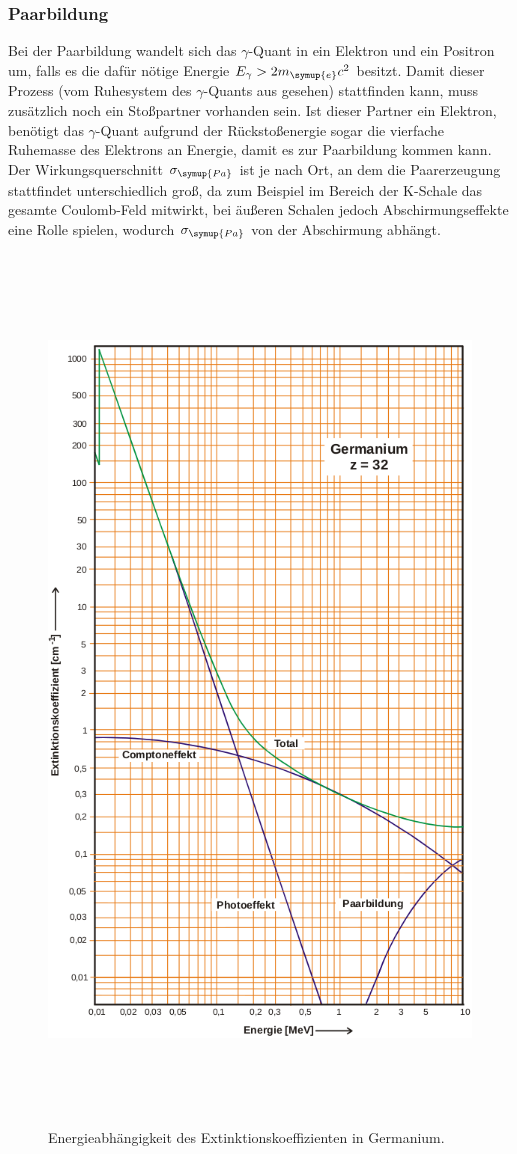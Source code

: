 \subsubsection{Paarbildung}
Bei der Paarbildung wandelt sich das $\gamma$-Quant in ein Elektron und ein Positron um, falls es die dafür nötige Energie $E_{\gamma}>2m_{\symup{e}}c^2$ besitzt.
Damit dieser Prozess (vom Ruhesystem des $\gamma$-Quants aus gesehen) stattfinden kann, muss zusätzlich noch ein Stoßpartner vorhanden sein.
Ist dieser Partner ein Elektron, benötigt das $\gamma$-Quant aufgrund der Rückstoßenergie sogar die vierfache Ruhemasse des Elektrons an Energie, damit es zur Paarbildung kommen kann.
Der Wirkungsquerschnitt $\sigma_{\symup{Pa}}$ ist je nach Ort, an dem die Paarerzeugung stattfindet unterschiedlich groß, da zum Beispiel im Bereich der K-Schale das gesamte Coulomb-Feld mitwirkt, bei äußeren Schalen
jedoch Abschirmungseffekte eine Rolle spielen, wodurch $\sigma_{\symup{Pa}}$ von der Abschirmung abhängt.
 \begin{figure}
   \centering
   \includegraphics[height=23cm]{content/pictures/Germanium.png}
   \caption{Energieabhängigkeit des Extinktionskoeffizienten in Germanium.\cite{V18}}
   \label{fig:Germanium}
 \end{figure}

